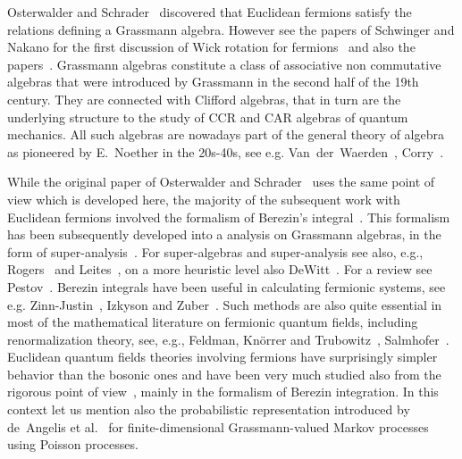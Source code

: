 \documentclass[11pt]{article}
\begin{document}
Osterwalder and
Schrader~{\cite{osterwalder_euclidean_1973,osterwalder_euclidean_1973-2}}
discovered that Euclidean fermions satisfy the relations defining a Grassmann
algebra. However see the papers of Schwinger and Nakano for the first
discussion of Wick rotation for
fermions~{\cite{schwinger_euclidean_1958,schwinger_euclidean_1959}} and also
the
papers~{\cite{van_nieuwenhuizen_euclidean_1996,williams_euclidean_1974,MR0452281,lehmann_probabilistic_1991,borasi}}.
Grassmann algebras constitute a class of associative non commutative algebras
that were introduced by Grassmann in the second half of the 19th century. They
are connected with Clifford algebras, that in turn are the underlying
structure to the study of CCR and CAR algebras of quantum mechanics. All such
algebras are nowadays part of the general theory of algebra as pioneered by
E.~Noether in the 20s-40s, see e.g.
Van~der~Waerden~{\cite{van2003algebra1,van2003algebra2}},
Corry~{\cite{corry_modern_2004}}.

While the original paper of Osterwalder and
Schrader~{\cite{osterwalder_euclidean_1973-2}} uses the same point of view
which is developed here, the majority of the subsequent work with Euclidean
fermions involved the formalism of Berezin's integral~{\cite{Berezin2}}. This
formalism has been subsequently developed into a analysis on Grassmann
algebras, in the form of super-analysis~{\cite{Berezin2}}. For super-algebras
and super-analysis see also, e.g., Rogers~{\cite{Rogers2007}} and
Leites~{\cite{Leites}}, on a more heuristic level also DeWitt~{\cite{DeWitt}}.
For a review see Pestov~{\cite{pestov_analysis_1994}}. Berezin integrals have
been useful in calculating fermionic systems, see e.g.
Zinn-Justin~{\cite{ZinnJustin}}, Izkyson and Zuber~{\cite{Itzykson}}. Such
methods are also quite essential in most of the mathematical literature on
fermionic quantum fields, including renormalization theory, see, e.g.,
Feldman, Kn{\"o}rrer and Trubowitz~{\cite{MR1905424}},
Salmhofer~{\cite{salmhofer_renormalization}}. Euclidean quantum fields
theories involving fermions have surprisingly simpler behavior than the
bosonic ones and have been very much studied also from the rigorous point of
view~{\cite{gawedzki_gross_neveu_1985,feldman_renormalizable_1986,lesniewski_effective_1987,rivasseau_perturbative_1991,disertori_continuous_1998,benfatto_functional_2007,mastropietro_non-perturbative_2008}},
mainly in the formalism of Berezin integration. In this context let us mention
also the probabilistic representation introduced by de~Angelis et
al.~{\cite{angelis_berezin_1998}} for finite-dimensional Grassmann-valued
Markov processes using Poisson processes.
\end{document}
